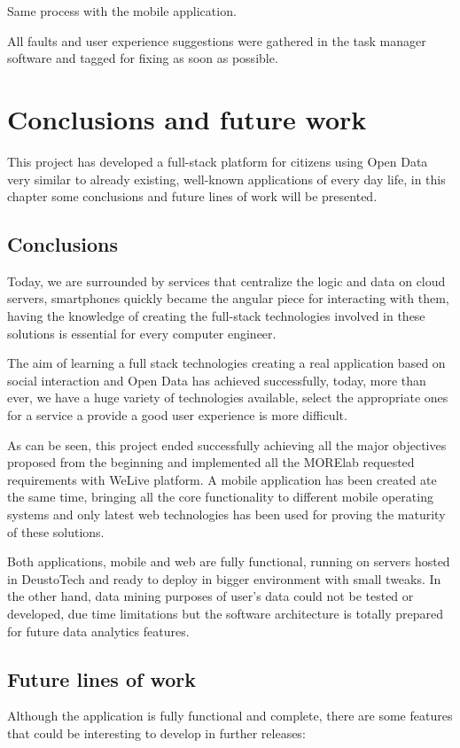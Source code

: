 \documentclass{DeustoFDP}
\begin{document}
Same process with the mobile application.

All faults and user experience suggestions were gathered in the task manager software and tagged for fixing as soon as possible.

\chapter{Conclusions and future work}\label{cha:conclusions}
This project has developed a full-stack platform for citizens using Open Data very similar to already existing, well-known applications of every day life, in this chapter some conclusions and future lines of work will be presented.

\section{Conclusions}
Today, we are surrounded by services that centralize the logic and data on cloud servers, smartphones quickly became the angular piece for interacting with them, having the knowledge of creating the full-stack technologies involved in these solutions is essential for every computer engineer.

The aim of learning a full stack technologies creating a real application based on social interaction and Open Data has achieved successfully, today, more than ever, we have a huge variety of technologies available, select the appropriate ones for a service a provide a good user experience is more difficult.

As can be seen, this project ended successfully achieving all the major objectives proposed from the beginning and implemented all the MORElab requested requirements with WeLive platform. A mobile application has been created ate the same time, bringing all the core functionality to different mobile operating systems and only latest web technologies has been used for proving the maturity of these solutions.

Both applications, mobile and web are fully functional, running on servers hosted in DeustoTech and ready to deploy in bigger environment with small tweaks. In the other hand, data mining purposes of user's data could not be tested or developed, due time limitations but the software architecture is totally prepared for future data analytics features.

\section{Future lines of work}
Although the application is fully functional and complete, there are some features that could be interesting to develop in further releases:
\end{document}
